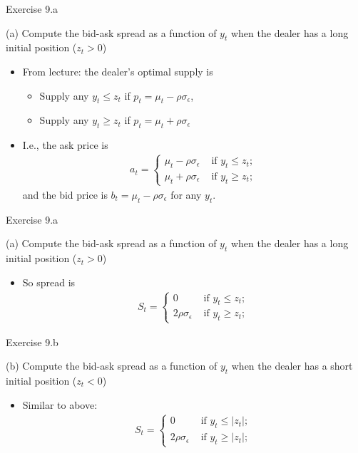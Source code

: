 \documentclass[english,10pt
,aspectratio=169
]{beamer}
\begin{document}
\begin{frame}{Exercise 9.a}
	\begin{exampleblock}{}
		(a) Compute the bid-ask spread as a function of $y_t$ when the dealer has a long initial position ($z_t > 0$)
	\end{exampleblock}
	\pause
	\begin{itemize}
		\item From lecture: the dealer's optimal supply is
		\begin{itemize}
			\item Supply any $y_t \leq z_t$ if $p_t = \mu_t - \rho\sigma_{\epsilon}$,
			\item Supply any $y_t \geq z_t$ if $p_t = \mu_t + \rho\sigma_{\epsilon}$
		\end{itemize}
		\item I.e., the ask price is
		\begin{align*}
			a_t = 
			\begin{cases}
				\mu_t - \rho\sigma_{\epsilon} & \text{ if } y_t \leq z_t;
				\\
				\mu_t + \rho\sigma_{\epsilon} & \text{ if } y_t \geq z_t;
			\end{cases}
		\end{align*}
		and the bid price is $b_t = \mu_t - \rho\sigma_{\epsilon}$ for any $y_t$.
	\end{itemize}
\end{frame}


\begin{frame}{Exercise 9.a}
	\begin{exampleblock}{}
		(a) Compute the bid-ask spread as a function of $y_t$ when the dealer has a long initial position ($z_t > 0$)
	\end{exampleblock}
	\begin{itemize}
		\item So spread is
		\begin{align*}
			S_t = 
			\begin{cases}
				0 & \text{ if } y_t \leq z_t;
				\\
				2\rho\sigma_{\epsilon} & \text{ if } y_t \geq z_t;
			\end{cases}
		\end{align*}
	\end{itemize}
\end{frame}


\begin{frame}{Exercise 9.b}
\begin{exampleblock}{}
	(b) Compute the bid-ask spread as a function of $y_t$ when the dealer has a short initial position ($z_t < 0$)
\end{exampleblock}
\begin{itemize}
	\item Similar to above:
	\begin{align*}
		S_t = 
		\begin{cases}
		0 & \text{ if } y_t \leq |z_t|;
		\\
		2\rho\sigma_{\epsilon} & \text{ if } y_t \geq |z_t|;
		\end{cases}
	\end{align*}
\end{itemize}
\end{frame}
\end{document}

